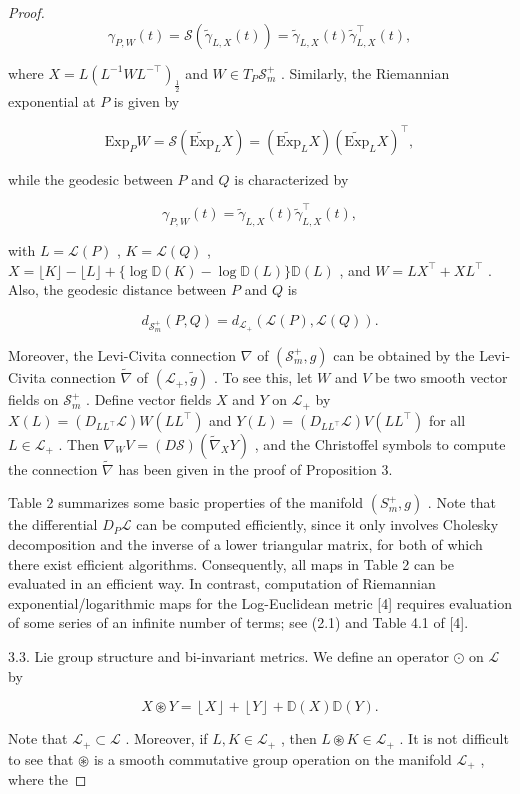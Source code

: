 \documentclass[11pt]{article}
\begin{document}
\begin{proof}
$$
\gamma_ {P, W} (t) = \mathcal {S} (\tilde {\gamma} _ {L, X} (t)) = \tilde {\gamma} _ {L, X} (t) \tilde {\gamma} _ {L, X} ^ {\top} (t),
$$

where  $X = L(L^{-1}WL^{-\top})_{\frac{1}{2}}$  and  $W \in T_P\mathcal{S}_m^+$ . Similarly, the Riemannian exponential at  $P$  is given by

$$
\mathrm {E x p} _ {P} W = \mathcal {S} (\widetilde {\mathrm {E x p}} _ {L} X) = (\widetilde {\mathrm {E x p}} _ {L} X) (\widetilde {\mathrm {E x p}} _ {L} X) ^ {\top},
$$

while the geodesic between  $P$  and  $Q$  is characterized by

$$
\gamma_ {P, W} (t) = \tilde {\gamma} _ {L, X} (t) \tilde {\gamma} _ {L, X} ^ {\top} (t),
$$

with  $L = \mathcal{L}(P)$ ,  $K = \mathcal{L}(Q)$ ,  $X = \lfloor K\rfloor -\lfloor L\rfloor +\{\log \mathbb{D}(K) - \log \mathbb{D}(L)\} \mathbb{D}(L)$ , and  $W = LX^{\top} + XL^{\top}$ . Also, the geodesic distance between  $P$  and  $Q$  is

$$
d _ {\mathcal {S} _ {m} ^ {+}} (P, Q) = d _ {\mathcal {L} _ {+}} (\mathcal {L} (P), \mathcal {L} (Q)).
$$

Moreover, the Levi-Civita connection  $\nabla$  of  $(\mathcal{S}_m^+,g)$  can be obtained by the Levi-Civita connection  $\tilde{\nabla}$  of  $(\mathcal{L}_{+},\tilde{g})$ . To see this, let  $W$  and  $V$  be two smooth vector fields on  $\mathcal{S}_m^+$ . Define vector fields  $X$  and  $Y$  on  $\mathcal{L}_{+}$  by  $X(L) = (D_{LL^{\top}}\mathcal{L})W(LL^{\top})$  and  $Y(L) = (D_{LL^{\top}}\mathcal{L})V(LL^{\top})$  for all  $L\in \mathcal{L}_{+}$ . Then  $\nabla_W V = (D\mathcal{S})(\tilde{\nabla}_XY)$ , and the Christoffel symbols to compute the connection  $\tilde{\nabla}$  has been given in the proof of Proposition 3.

Table 2 summarizes some basic properties of the manifold  $(S_m^+, g)$ . Note that the differential  $D_P\mathcal{L}$  can be computed efficiently, since it only involves Cholesky decomposition and the inverse of a lower triangular matrix, for both of which there exist efficient algorithms. Consequently, all maps in Table 2 can be evaluated in an efficient way. In contrast, computation of Riemannian exponential/logarithmic maps for the Log-Euclidean metric [4] requires evaluation of some series of an infinite number of terms; see (2.1) and Table 4.1 of [4].

3.3. Lie group structure and bi-invariant metrics. We define an operator  $\odot$  on  $\mathcal{L}$  by

$$
X \circledast Y = \left\lfloor X \right\rfloor + \left\lfloor Y \right\rfloor + \mathbb {D} (X) \mathbb {D} (Y).
$$

Note that  $\mathcal{L}_{+} \subset \mathcal{L}$ . Moreover, if  $L, K \in \mathcal{L}_{+}$ , then  $L \circledast K \in \mathcal{L}_{+}$ . It is not difficult to see that  $\circledast$  is a smooth commutative group operation on the manifold  $\mathcal{L}_{+}$ , where the

\end{proof}
\end{document}
